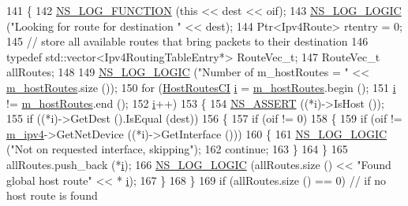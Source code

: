 \begin{DoxyCode}
141 \{
142   \hyperlink{log-macros-disabled_8h_a90b90d5bad1f39cb1b64923ea94c0761}{NS\_LOG\_FUNCTION} (\textcolor{keyword}{this} << dest << oif);
143   \hyperlink{group__logging_ga88acd260151caf2db9c0fc84997f45ce}{NS\_LOG\_LOGIC} (\textcolor{stringliteral}{"Looking for route for destination "} << dest);
144   Ptr<Ipv4Route> rtentry = 0;
145   \textcolor{comment}{// store all available routes that bring packets to their destination}
146   \textcolor{keyword}{typedef} std::vector<Ipv4RoutingTableEntry*> RouteVec\_t;
147   RouteVec\_t allRoutes;
148 
149   \hyperlink{group__logging_ga88acd260151caf2db9c0fc84997f45ce}{NS\_LOG\_LOGIC} (\textcolor{stringliteral}{"Number of m\_hostRoutes = "} << \hyperlink{classns3_1_1Ipv4GlobalRouting_adcef09fc8af430a93c9437edfc22511c}{m\_hostRoutes}.size ());
150   \textcolor{keywordflow}{for} (\hyperlink{classns3_1_1Ipv4GlobalRouting_aae0bc92477a22c30a84d24b7059feba3}{HostRoutesCI} \hyperlink{bernuolliDistribution_8m_a6f6ccfcf58b31cb6412107d9d5281426}{i} = \hyperlink{classns3_1_1Ipv4GlobalRouting_adcef09fc8af430a93c9437edfc22511c}{m\_hostRoutes}.begin (); 
151        \hyperlink{bernuolliDistribution_8m_a6f6ccfcf58b31cb6412107d9d5281426}{i} != \hyperlink{classns3_1_1Ipv4GlobalRouting_adcef09fc8af430a93c9437edfc22511c}{m\_hostRoutes}.end (); 
152        \hyperlink{bernuolliDistribution_8m_a6f6ccfcf58b31cb6412107d9d5281426}{i}++) 
153     \{
154       \hyperlink{assert_8h_a6dccdb0de9b252f60088ce281c49d052}{NS\_ASSERT} ((*i)->IsHost ());
155       \textcolor{keywordflow}{if} ((*i)->GetDest ().IsEqual (dest)) 
156         \{
157           \textcolor{keywordflow}{if} (oif != 0)
158             \{
159               \textcolor{keywordflow}{if} (oif != \hyperlink{classns3_1_1Ipv4GlobalRouting_a8ca97d33982a32fa41a98b56dbec2edc}{m\_ipv4}->GetNetDevice ((*i)->GetInterface ()))
160                 \{
161                   \hyperlink{group__logging_ga88acd260151caf2db9c0fc84997f45ce}{NS\_LOG\_LOGIC} (\textcolor{stringliteral}{"Not on requested interface, skipping"});
162                   \textcolor{keywordflow}{continue};
163                 \}
164             \}
165           allRoutes.push\_back (*\hyperlink{bernuolliDistribution_8m_a6f6ccfcf58b31cb6412107d9d5281426}{i});
166           \hyperlink{group__logging_ga88acd260151caf2db9c0fc84997f45ce}{NS\_LOG\_LOGIC} (allRoutes.size () << \textcolor{stringliteral}{"Found global host route"} << *
      \hyperlink{bernuolliDistribution_8m_a6f6ccfcf58b31cb6412107d9d5281426}{i}); 
167         \}
168     \}
169   \textcolor{keywordflow}{if} (allRoutes.size () == 0) \textcolor{comment}{// if no host route is found}

\end{DoxyCode}
